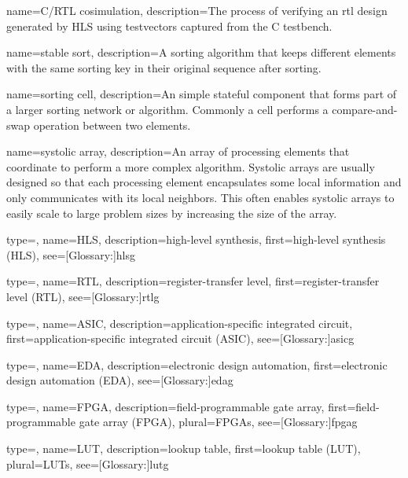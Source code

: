 {
	name={C/RTL cosimulation},
	description={The process of verifying an \gls{rtl} design generated by HLS using testvectors captured from the C testbench.}
}

{
	name={stable sort},
	description={A sorting algorithm that keeps different elements with the same sorting key in their original sequence after sorting.}
}

{
	name={sorting cell},
	description={An simple stateful component that forms part of a larger sorting network or algorithm.  Commonly a cell performs a compare-and-swap operation between two elements.}
}

{
	name={systolic array},
	description={An array of processing elements that coordinate to perform a more complex algorithm.  Systolic arrays are usually designed so that each processing element encapsulates some local information and only communicates with its local neighbors.  This often enables systolic arrays to easily scale to large problem sizes by increasing the size of the array.}
}



{
	type=\acronymtype, 
	name={HLS}, 
	description={high-level synthesis}, 
	first={high-level synthesis (HLS)}, 
	see=[Glossary:]{hlsg}
}

{
	type=\acronymtype, 
	name={RTL}, 
	description={register-transfer level}, 
	first={register-transfer level (RTL)}, 
	see=[Glossary:]{rtlg}
}

{
	type=\acronymtype, 
	name={ASIC}, 
	description={application-specific integrated circuit}, 
	first={application-specific integrated circuit (ASIC)}, 
	see=[Glossary:]{asicg}
}

{
	type=\acronymtype, 
	name={EDA}, 
	description={electronic design automation}, 
	first={electronic design automation (EDA)}, 
	see=[Glossary:]{edag}
}

{
	type=\acronymtype, 
	name={FPGA}, 
	description={field-programmable gate array}, 
	first={field-programmable gate array (FPGA)}, 
	plural={FPGAs},
	see=[Glossary:]{fpgag}
}

{
	type=\acronymtype, 
	name={LUT}, 
	description={lookup table}, 
	first={lookup table (LUT)}, 
	plural={LUTs},
	see=[Glossary:]{lutg}
}

